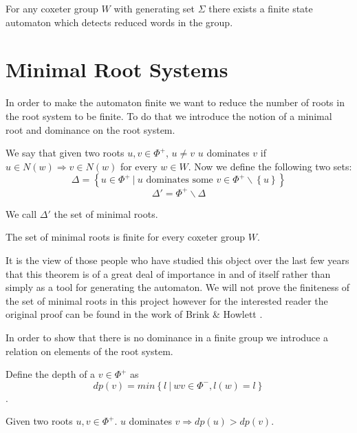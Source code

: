 \documentclass[a4paper,12pt]{article}
\begin{document}
\begin{thm}
	For any coxeter group $W$ with generating set $\Sigma$ there exists a finite state automaton which detects reduced words in the group.
\end{thm}

\section{Minimal Root Systems}
In order to make the automaton finite we want to reduce the number of roots in the root system to be finite. To do that we introduce the notion of a minimal root and dominance on the root system.
	
\begin{definition}
	We say that given two roots $u, v \in \Phi^+$, $u \neq v$ $u$ dominates $v$ if $u \in N(w) \Rightarrow v \in N(w)$ for every $w \in W$. Now we define the following two sets:
	\[\Delta = \left\{ u \in \Phi^+ \: | \: u \text{ dominates some } v \in \Phi^+\backslash\left\{u\right\} \right\} \]
	\[\Delta' = \Phi^+\backslash\Delta\]
\end{definition}

We call $\Delta'$ the set of minimal roots.

\begin{thm}
	\label{minimal_root_set_finite}
	The set of minimal roots is finite for every coxeter group $W$.
\end{thm}

It is the view of those people who have studied this object over the last few years that this theorem is of a great deal of importance in and of itself rather than simply as a tool for generating the automaton. We will not prove the finiteness of the set of minimal roots in this project however for the interested reader the original proof can be found in the work of Brink \& Howlett \cite{brinkhowlett93}.

In order to show that there is no dominance in a finite group we introduce a relation on elements of the root system.

\begin{definition}
	Define the depth of a $v \in \Phi^+$ as \[dp(v) = min\left\{l \: | \: wv \in \Phi^-, l(w) = l\right\}\].
\end{definition}

\begin{lem}
\label{lem_dom_implies_depth}
	Given two roots $u, v \in \Phi^+$. $u$ dominates $v \Rightarrow dp(u) > dp(v)$.
\end{lem}
\end{document}
